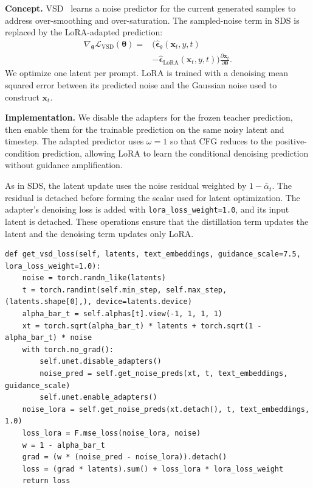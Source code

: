 \noindent\textbf{Concept.}
VSD~\cite{wang2023prolificdreamer} learns a noise predictor for the current generated samples to
address over-smoothing and over-saturation.
The sampled-noise term in SDS is replaced by the LoRA-adapted prediction:
\begin{equation}
\begin{aligned}
 \nabla_{\boldsymbol{\theta}}\mathcal{L}_{\mathrm{VSD}}(\boldsymbol{\theta})
 ={}&\bigl(\hat{\boldsymbol{\epsilon}}_\theta(\mathbf{x}_t,y,t)\\
     &-\hat{\boldsymbol{\epsilon}}_{\mathrm{LoRA}}(\mathbf{x}_t,y,t)\bigr)
       \frac{\partial\mathbf{x}_t}{\partial\boldsymbol{\theta}}.
\end{aligned}
 \label{eq:vsd_gradient}
\end{equation}
We optimize one latent per prompt.
LoRA is trained with a denoising mean squared error between its predicted noise and the Gaussian
noise used to construct $\mathbf{x}_t$.

\noindent\textbf{Implementation.}
We disable the adapters for the frozen teacher prediction, then enable them for the trainable
prediction on the same noisy latent and timestep.
The adapted predictor uses $\omega=1$ so that CFG reduces to the positive-condition prediction,
allowing LoRA to learn the conditional denoising prediction without guidance amplification.

As in SDS, the latent update uses the noise residual weighted by $1-\bar\alpha_t$.
The residual is detached before forming the scalar used for latent optimization.
The adapter's denoising loss is added with \texttt{lora\_loss\_weight=1.0}, and its input latent is
detached.
These operations ensure that the distillation term updates the latent and the denoising term updates
only LoRA.

\begin{lstlisting}
def get_vsd_loss(self, latents, text_embeddings, guidance_scale=7.5, lora_loss_weight=1.0):
    noise = torch.randn_like(latents)
    t = torch.randint(self.min_step, self.max_step, (latents.shape[0],), device=latents.device)
    alpha_bar_t = self.alphas[t].view(-1, 1, 1, 1)
    xt = torch.sqrt(alpha_bar_t) * latents + torch.sqrt(1 - alpha_bar_t) * noise
    with torch.no_grad():
        self.unet.disable_adapters()
        noise_pred = self.get_noise_preds(xt, t, text_embeddings, guidance_scale)
        self.unet.enable_adapters()
    noise_lora = self.get_noise_preds(xt.detach(), t, text_embeddings, 1.0)
    loss_lora = F.mse_loss(noise_lora, noise)
    w = 1 - alpha_bar_t
    grad = (w * (noise_pred - noise_lora)).detach()
    loss = (grad * latents).sum() + loss_lora * lora_loss_weight
    return loss
\end{lstlisting}

